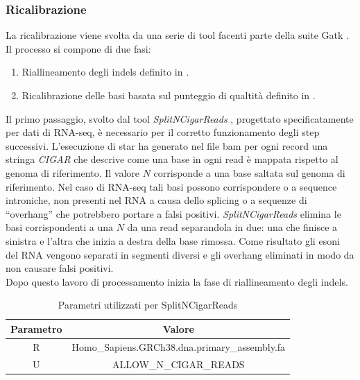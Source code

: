     \subsubsection{Ricalibrazione}
    La ricalibrazione viene svolta da una serie di tool facenti parte della suite Gatk \cite{gatk}.
    Il processo si compone di due fasi:
    \begin{multicols}{2}
      \begin{enumerate}
        \item Riallineamento degli indels definito in \cite{indelrealign}.
        \item Ricalibrazione delle basi basata sul punteggio di qualtit\`a definito in \cite{bqsr}.
      \end{enumerate}
    \end{multicols}
    Il primo passaggio, svolto dal tool \emph{SplitNCigarReads} \cite{splitncigarreads}, progettato specificatamente per dati di RNA-seq, \`e necessario per il corretto funzionamento degli step successivi.
    L'esecuzione di star ha generato nel file bam per ogni record una stringa  \emph{CIGAR} che descrive come una base in ogni read \`e mappata rispetto al genoma di riferimento.
    Il valore $N$ corrisponde a una base saltata sul genoma di riferimento.
    Nel caso di RNA-seq tali basi possono corrispondere o a sequence introniche, non presenti nel RNA a causa dello splicing o a sequenze di ``overhang'' che potrebbero portare a falsi positivi.
    \emph{SplitNCigarReads} elimina le basi corrispondenti a una $N$ da una read separandola in due: una che finisce a sinistra e l'altra che inizia a destra della base rimossa.
    Come risultato gli esoni del RNA vengono separati in segmenti diversi e gli overhang eliminati in modo da non causare falsi positivi.\\
    Dopo questo lavoro di processamento inizia la fase di riallineamento degli indels.
    \begin{table}[H]
        \centering
        \begin{tabular}{|c|c|}
                \hline
                Parametro & Valore\\
                \hline
                R & Homo\_Sapiens.GRCh38.dna.primary\_assembly.fa\\
                \hline
                U & ALLOW\_N\_CIGAR\_READS\\
                \hline
         \end{tabular}
         \caption{Parametri utilizzati per SplitNCigarReads}
    \end{table}

